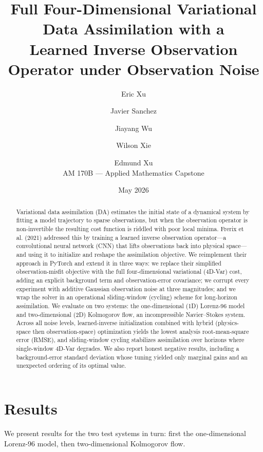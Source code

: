 \documentclass[11pt]{article}
\title{\textbf{Full Four-Dimensional Variational Data Assimilation with a\\
Learned Inverse Observation Operator under Observation Noise}}
\author{
  Eric Xu \and Javier Sanchez \and Jiayang Wu \and Wilson Xie \and Edmund Xu \\[4pt]
  \small AM 170B --- Applied Mathematics Capstone
}
\date{May 2026}
\begin{document}
\maketitle

\begin{abstract}
Variational data assimilation (DA) estimates the initial state of a dynamical system by fitting a
model trajectory to sparse observations, but when the observation operator is non-invertible the
resulting cost function is riddled with poor local minima. Frerix et al. (2021) addressed this by
training a learned inverse observation operator---a convolutional neural network (CNN) that lifts
observations back into physical space---and using it to initialize and reshape the assimilation
objective. We reimplement their approach in PyTorch and extend it in three ways: we replace their
simplified observation-misfit objective with the full four-dimensional variational (4D-Var) cost,
adding an explicit background term and observation-error covariance; we corrupt every experiment
with additive Gaussian observation noise at three magnitudes; and we wrap the solver in an
operational sliding-window (cycling) scheme for long-horizon assimilation. We evaluate on two
systems: the one-dimensional (1D) Lorenz-96 model and two-dimensional (2D) Kolmogorov flow, an
incompressible Navier--Stokes system. Across all noise levels, learned-inverse initialization
combined with hybrid (physics-space then observation-space) optimization yields the lowest analysis
root-mean-square error (RMSE), and sliding-window cycling stabilizes assimilation over horizons
where single-window 4D-Var degrades. We also report honest negative results, including a
background-error standard deviation whose tuning yielded only marginal gains and an
unexpected ordering of its optimal value.
\end{abstract}





\section{Results}
We present results for the two test systems in turn: first the one-dimensional Lorenz-96 model,
then two-dimensional Kolmogorov flow.








\end{document}
